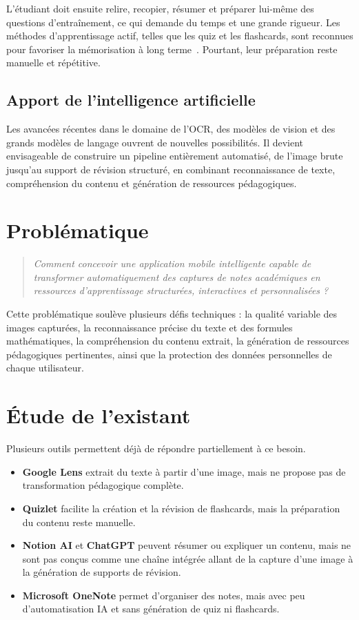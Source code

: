 \documentclass[12pt,a4paper]{report}
\begin{document}
L'étudiant doit ensuite relire, recopier, résumer et préparer lui-même des questions d'entraînement, ce qui demande du temps et une grande rigueur. Les méthodes d'apprentissage actif, telles que les quiz et les flashcards, sont reconnues pour favoriser la mémorisation à long terme~\cite{ebbinghaus1885}. Pourtant, leur préparation reste manuelle et répétitive.

\subsection{Apport de l'intelligence artificielle}

Les avancées récentes dans le domaine de l'OCR, des modèles de vision et des grands modèles de langage ouvrent de nouvelles possibilités. Il devient envisageable de construire un pipeline entièrement automatisé, de l'image brute jusqu'au support de révision structuré, en combinant reconnaissance de texte, compréhension du contenu et génération de ressources pédagogiques.

\section{Problématique}

\begin{quote}
\textit{Comment concevoir une application mobile intelligente capable de transformer automatiquement des captures de notes académiques en ressources d'apprentissage structurées, interactives et personnalisées ?}
\end{quote}

Cette problématique soulève plusieurs défis techniques : la qualité variable des images capturées, la reconnaissance précise du texte et des formules mathématiques, la compréhension du contenu extrait, la génération de ressources pédagogiques pertinentes, ainsi que la protection des données personnelles de chaque utilisateur.

\section{Étude de l'existant}

Plusieurs outils permettent déjà de répondre partiellement à ce besoin.

\begin{itemize}[label=--]
    \item \textbf{Google Lens} extrait du texte à partir d'une image, mais ne propose pas de transformation pédagogique complète.
    \item \textbf{Quizlet} facilite la création et la révision de flashcards, mais la préparation du contenu reste manuelle.
    \item \textbf{Notion AI} et \textbf{ChatGPT} peuvent résumer ou expliquer un contenu, mais ne sont pas conçus comme une chaîne intégrée allant de la capture d'une image à la génération de supports de révision.
    \item \textbf{Microsoft OneNote} permet d'organiser des notes, mais avec peu d'automatisation IA et sans génération de quiz ni flashcards.
\end{itemize}
\end{document}
